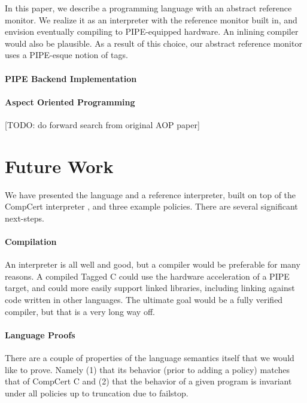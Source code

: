 \documentclass{llncs}
\begin{document}
In this paper, we describe a programming language with an abstract reference monitor.
We realize it as an interpreter with the reference monitor built in, and envision
eventually compiling to PIPE-equipped hardware. An inlining compiler would also be plausible.
As a result of this choice, our abstract reference monitor uses a PIPE-esque notion of
tags.

\paragraph{PIPE Backend Implementation}

\paragraph{Aspect Oriented Programming}

[TODO: do forward search from original AOP paper]

\section{Future Work}
\label{sec:futurework}

We have presented the language and a reference interpreter, built on top of the CompCert interpreter
\cite{Leroy09:CompCert}, and three example policies. There are several significant next-steps.

\paragraph{Compilation}

An interpreter is all well and good, but a compiler would be preferable for many reasons.
A compiled Tagged C could use the hardware acceleration of a PIPE target, and could more easily
support linked libraries, including linking against code written in other languages.
The ultimate goal would be a fully verified compiler, but that is a very long way off.

\paragraph{Language Proofs}

There are a couple of properties of the language semantics itself that we would like to prove.
Namely (1) that its behavior (prior to adding a policy) matches that of CompCert C and
(2) that the behavior of a given program is invariant under all policies up to truncation due
to failstop.
\end{document}
